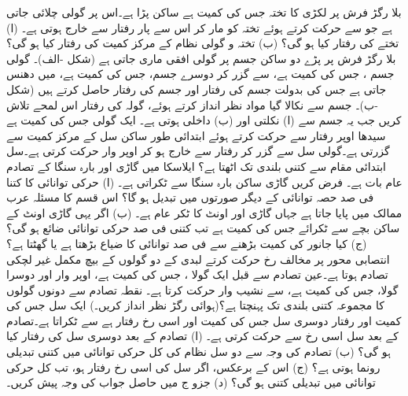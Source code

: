 بلا رگڑ فرش پر  لکڑی کا تختہ جس کی کمیت  ہے ساکن  پڑا  ہے۔اس پر   گولی چلائی جاتی ہے جو  سے حرکت کرتے ہوئے تختہ کو مار کر اس  سے پار  رفتار سے   خارج ہوتی ہے۔ (ا) تختے  کی رفتار کیا ہو گی؟ (ب)  تختہ و گولی نظام کے مرکز کمیت کی رفتار کیا ہو گی؟
بلا رگڑ فرش پر پڑے  دو ساکن  جسم پر  گولی افقی ماری جاتی ہے (شکل -الف)۔ گولی جسم ، جس کی کمیت  ہے، سے گزر کر دوسرے جسم، جس کی کمیت  ہے، میں دھنس جاتی ہے جس کی بدولت  جسم  کی رفتار  اور جسم  کی رفتار   حاصل کرتے ہیں (شکل -ب)۔ جسم  سے نکالا گیا مواد نظر انداز کرتے ہوئے، گولہ کی رفتار اس لمحے تلاش کریں جب یہ جسم  سے (ا) نکلتی اور (ب) داخلی ہوتی ہے۔
ایک گولی جس کی کمیت  ہے  سیدھا اوپر  رفتار سے  حرکت  کرتے ہوئے  ابتدائی طور ساکن   سل کے مرکز کمیت سے گزرتی ہے۔گولی سل سے گزر کر  رفتار سے خارج ہو کر اوپر وار حرکت کرتی ہے۔سل ابتدائی مقام سے کتنی بلندی تک اٹھتا ہے؟
ایلاسکا  میں گاڑی اور  بارہ سنگا  کے تصادم عام بات ہے۔ فرض کریں  گاڑی   ساکن  بارہ سنگا سے ٹکراتی ہے۔ (ا)  حرکی توانائی کا کتنا فی صد حصہ توانائی   کے دیگر  صورتوں میں تبدیل ہو گا؟ اس قسم کا مسئلہ  عرب  ممالک میں پایا جاتا ہے جہاں گاڑی اور اونٹ کا ٹکر عام ہے۔ (ب) اگر یہی گاڑی اونٹ کے  ساکن بچے سے ٹکرائے  جس کی کمیت    ہے تب  کتنی فی صد  حرکی توانائی  ضائع ہو گی؟ (ج) کیا جانور کی کمیت بڑھنے سے  فی صد توانائی کا ضیاع بڑھتا ہے یا گھٹتا ہے؟
انتصابی محور پر مخالف رخ حرکت کرتے  لبدی  کے دو گولوں کے بیچ مکمل غیر لچکی تصادم ہوتا ہے۔عین تصادم سے قبل ایک گولا ، جس کی کمیت   ہے،    اوپر وار  اور دوسرا گولا، جس کی کمیت  ہے،  سے  نشیب وار حرکت کرتا ہے۔ نقطہ تصادم سے دونوں گولوں  کا مجموعہ کتنی بلندی تک پہنچتا ہے؟(ہوائی رگڑ نظر انداز کریں۔)
ایک سل جس کی کمیت  اور رفتار   دوسری  سل جس کی کمیت  اور اسی رخ رفتار  ہے سے ٹکراتا ہے۔تصادم کے بعد  سل اسی رخ  سے حرکت کرتی ہے۔ (ا)  تصادم کے بعد دوسری سل کی رفتار کیا ہو گی؟ (ب)  تصادم کی وجہ سے دو  سل نظام کی کل  حرکی توانائی میں  کتنی تبدیلی رونما ہوتی ہے؟ (ج) اس کے برعکس، اگر   سل  کی اسی رخ رفتار  ہو، تب کل حرکی توانائی میں تبدیلی کتنی ہو گی؟ (د)  جزو ج میں حاصل جواب کی وجہ پیش کریں۔
